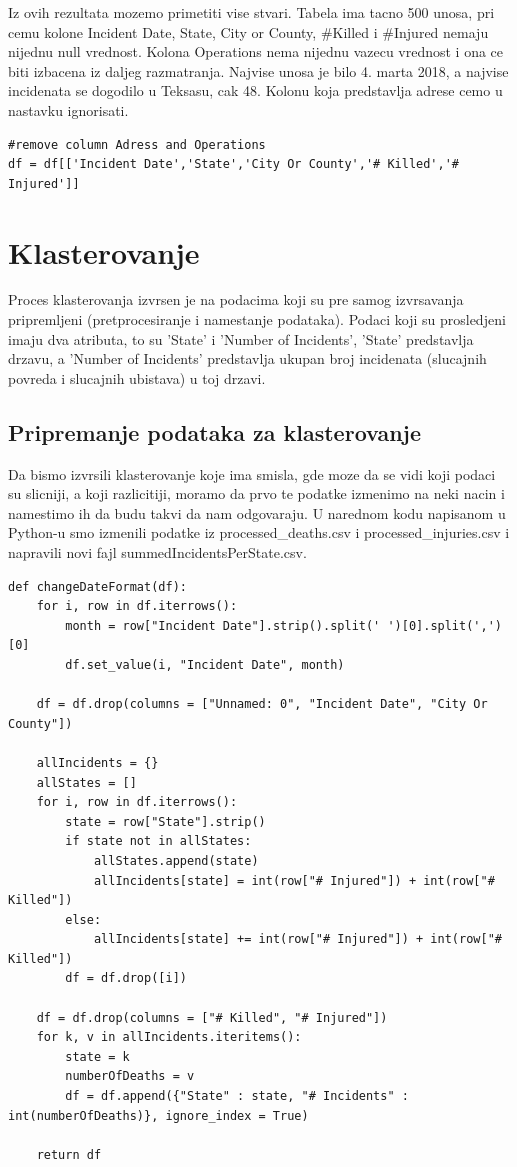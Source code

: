 \documentclass[11pt]{article} %
\begin{document}
Iz ovih rezultata mozemo primetiti vise stvari. Tabela ima tacno 500 unosa, pri cemu kolone Incident Date, State, City or County, \#Killed i \#Injured nemaju nijednu null vrednost. 
Kolona Operations nema nijednu vazecu vrednost i ona ce biti izbacena iz daljeg razmatranja. Najvise unosa je bilo 4. marta 2018, a najvise incidenata se dogodilo u Teksasu, cak 48.
Kolonu koja predstavlja adrese cemo u nastavku ignorisati. 
\begin{lstlisting}
#remove column Adress and Operations
df = df[['Incident Date','State','City Or County','# Killed','# Injured']]
\end{lstlisting}

	
	
	\newpage
	\section{Klasterovanje}
	Proces klasterovanja izvrsen je na podacima koji su pre samog izvrsavanja pripremljeni (pretprocesiranje i namestanje podataka). 
	Podaci koji su prosledjeni imaju dva atributa, to su 'State' i 'Number of Incidents', 'State' predstavlja drzavu, a 'Number of Incidents' predstavlja 
	ukupan broj incidenata (slucajnih povreda i slucajnih ubistava) u toj drzavi.
	
	\subsection{Pripremanje podataka za klasterovanje}
	Da bismo izvrsili klasterovanje koje ima smisla, gde moze da se vidi koji podaci su slicniji, a koji razlicitiji, moramo da prvo te podatke izmenimo na 
	neki nacin i namestimo ih da budu takvi da nam odgovaraju. U narednom kodu napisanom u Python-u smo izmenili podatke iz 
	processed\_deaths.csv i processed\_injuries.csv i napravili novi fajl summedIncidentsPerState.csv.
	\newline
	
	\begin{lstlisting}
def changeDateFormat(df):
	for i, row in df.iterrows():
		month = row["Incident Date"].strip().split(' ')[0].split(',')[0]
		df.set_value(i, "Incident Date", month)
	
	df = df.drop(columns = ["Unnamed: 0", "Incident Date", "City Or County"])
	
	allIncidents = {}
	allStates = []
	for i, row in df.iterrows():
		state = row["State"].strip()
		if state not in allStates:
			allStates.append(state)
			allIncidents[state] = int(row["# Injured"]) + int(row["# Killed"])
		else:
			allIncidents[state] += int(row["# Injured"]) + int(row["# Killed"])
		df = df.drop([i])
	
	df = df.drop(columns = ["# Killed", "# Injured"])
	for k, v in allIncidents.iteritems():
		state = k
		numberOfDeaths = v
		df = df.append({"State" : state, "# Incidents" : int(numberOfDeaths)}, ignore_index = True)
	
	return df
	
    \end{lstlisting}
	
\end{document}

